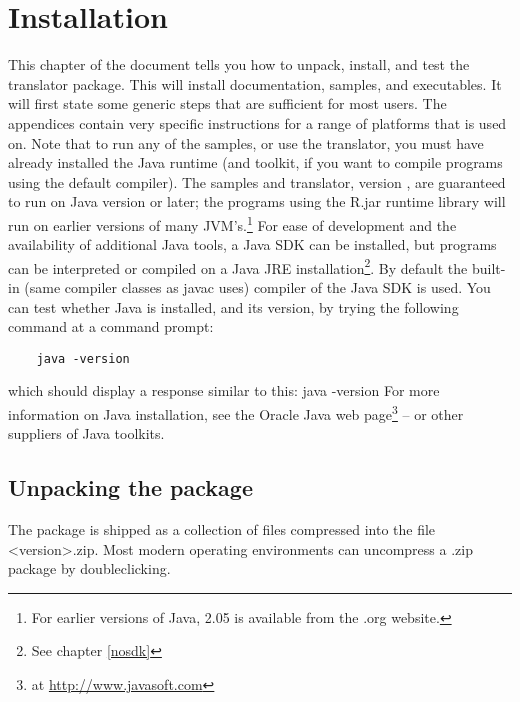 \chapter{Installation}
This chapter of the document tells you how to unpack, install, and test the \nr{} translator package. This will install documentation, samples, and executables. It will first state some generic steps that are sufficient for most users. The appendices contain very specific instructions for a range of platforms that \nr{} is used on. 
Note that to run any of the samples, or use the \nr{} translator, you must have already installed the Java runtime (and toolkit, if you want to compile \nr{} programs using the default compiler). 
The \nr{} samples and translator, version , are
guaranteed to run on Java version \minimalJVMversion{} or later; the programs using the
\nr{}R.jar runtime library will run on earlier versions of many JVM's.\footnote{For earlier versions of Java,
  \nr{} 2.05 is available from the \nr{}.org website.} For ease
of development and the availability of additional Java tools, a Java
SDK can be installed, but \nr{}
programs can be interpreted or compiled on a Java JRE
installation\footnote{See chapter \ref{nosdk}}. By
default the built-in (same compiler classes as javac uses) compiler of the Java SDK is used. You can test whether Java is installed, and its version, by trying the following command at a command prompt:
\begin{lstlisting} 
    java -version
\end{lstlisting}
which should display a response similar to this:
\bash[stderr]
java -version
\END
For more information on Java installation, see the Oracle Java web page\footnote{at \url{http://www.javasoft.com}} – or other suppliers of Java toolkits.

\section{Unpacking the \nr{} package}
The \nr{} package is shipped as a collection of files compressed into the file \nr{}<version>.zip. 
Most modern operating environments can uncompress a .zip package by doubleclicking.
